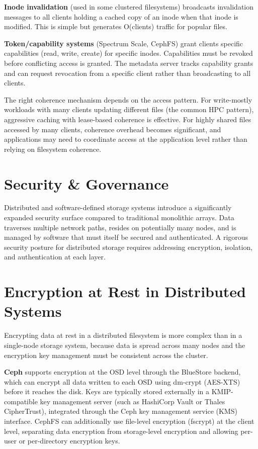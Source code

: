 \textbf{Inode invalidation} (used in some clustered filesystems) broadcasts invalidation messages to all clients holding a cached copy of an inode when that inode is modified. This is simple but generates O(clients) traffic for popular files.

\textbf{Token/capability systems} (Spectrum Scale, CephFS) grant clients specific capabilities (read, write, create) for specific inodes. Capabilities must be revoked before conflicting access is granted. The metadata server tracks capability grants and can request revocation from a specific client rather than broadcasting to all clients.

The right coherence mechanism depends on the access pattern. For write-mostly workloads with many clients updating different files (the common HPC pattern), aggressive caching with lease-based coherence is effective. For highly shared files accessed by many clients, coherence overhead becomes significant, and applications may need to coordinate access at the application level rather than relying on filesystem coherence.

\section{Security \& Governance}
Distributed and software-defined storage systems introduce a significantly expanded security surface compared to traditional monolithic arrays. Data traverses multiple network paths, resides on potentially many nodes, and is managed by software that must itself be secured and authenticated. A rigorous security posture for distributed storage requires addressing encryption, isolation, and authentication at each layer.

\section{Encryption at Rest in Distributed Systems}
Encrypting data at rest in a distributed filesystem is more complex than in a single-node storage system, because data is spread across many nodes and the encryption key management must be consistent across the cluster.

\textbf{Ceph} supports encryption at the OSD level through the BlueStore backend, which can encrypt all data written to each OSD using dm-crypt (AES-XTS) before it reaches the disk. Keys are typically stored externally in a KMIP-compatible key management server (such as HashiCorp Vault or Thales CipherTrust), integrated through the Ceph key management service (KMS) interface. CephFS can additionally use file-level encryption (fscrypt) at the client level, separating data encryption from storage-level encryption and allowing per-user or per-directory encryption keys.

